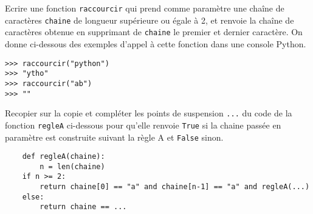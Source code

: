 \documentclass[11pt,a4paper]{article}
\begin{document}
\item
\SQListe
\item Ecrire une fonction {\tt raccourcir} qui prend comme paramètre une chaîne de caractères {\tt chaine} de longueur supérieure ou égale à 2, et renvoie la chaîne de caractères obtenue en supprimant de {\tt chaine} le premier et dernier caractère. On donne ci-dessous des exemples d'appel à cette fonction dans une console Python.
\begin{lstlisting}
>>> raccourcir("python")
>>> "ytho"
>>> raccourcir("ab")
>>> ""
\end{lstlisting}
\item Recopier sur la copie et compléter les points de suspension {\tt ...} du code de la fonction {\tt regleA} ci-dessous pour qu'elle renvoie {\tt True} si la chaine passée en paramètre est construite suivant la règle A et {\tt False} sinon.
\begin{lstlisting}
    def regleA(chaine):
        n = len(chaine)
    if n >= 2:
        return chaine[0] == "a" and chaine[n-1] == "a" and regleA(...)
    else:
        return chaine == ...
\end{lstlisting}

\FinListe
\FinListe
\end{document}
